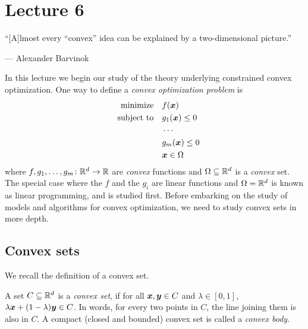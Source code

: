 %
%
% 


\chapter*{Lecture 6}
\addtocounter{chapter}{1}
\addtocounter{section}{-1}

\epigraph{``[A]lmost every ``convex'' idea can be explained by a two-dimensional picture.''}{--- \textup{Alexander Barvinok}}

In this lecture we begin our study of the theory underlying constrained convex optimization. One way to define a {\em convex optimization problem} is
\begin{align*}
\begin{split}
 \text{minimize}\quad & f(\bm{x})\\
 \quad\text{subject to}\quad & g_1(\bm{x})\leq 0\\
 & \cdots \\
 & g_m(\bm{x})\leq 0\\
 & \bm{x}\in \Omega
 \end{split}
\end{align*}
where $f,g_1,\dots,g_m\colon \mathbb{R}^d\to \mathbb{R}$ are {\em convex} functions and $\Omega\subseteq \mathbb{R}^d$ is a {\em convex} set. The special case where the $f$ and the $g_i$ are linear functions and $\Omega=\mathbb{R}^d$ is known as linear programming, and is studied first. Before embarking on the study of models and algorithms for convex optimization, we need to study convex sets in more depth.

\section{Convex sets}
We recall the definition of a convex set.
\begin{definition}
 A set $C\subseteq \mathbb{R}^d$ is a {\em convex set}, if for all $\bm{x},\bm{y}\in C$ and $\lambda\in [0,1]$, $\lambda\bm{x}+(1-\lambda)\bm{y}\in C$. In words, for every two points in $C$, the line joining them is also in $C$. A compact (closed and bounded) convex set is called a {\em convex body}.
\end{definition}


